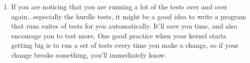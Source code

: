 \documentclass{article}
\begin{document}
\begin{enumerate}
  \item If you are noticing that you are running a lot of the tests over and
  over again...especially the hurdle tests, it might be a good idea to write
  a program that runs suites of tests for you automatically. It'll save you
  time, and also encourage you to test more. One good practice when your
  kernel starts getting big is to run a set of tests every time you make a
  change, so if your change breaks something, you'll immediately know.
\end{enumerate}
\end{document}
